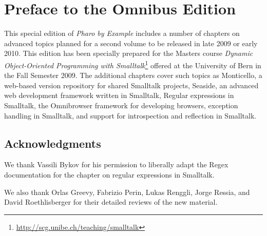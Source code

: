 \documentclass[a4paper,10pt,twoside]{book}
\begin{document}
	\sloppy
	\frontmatter
\fi
\chapter{Preface to the Omnibus Edition}\label{cha:omnibus}


This special edition of \emph{Pharo by Example} includes a number of chapters on advanced topics planned for a second volume to be released in late 2009 or early 2010.
This edition has been specially prepared for the Masters course \emph{Dynamic Object-Oriented Programming with Smalltalk}\footnote{\url{http://scg.unibe.ch/teaching/smalltalk}} offered at the University of Bern in the Fall Semester 2009.
The additional chapters cover such topics as
Monticello, a web-based version repository for shared Smalltalk projects,
Seaside, an advanced web development framework written in Smalltalk,
Regular expressions in Smalltalk,
the Omnibrowser framework for developing browsers,
exception handling in Smalltalk, and
support for introspection and reflection in Smalltalk.

\section*{Acknowledgments}

We thank Vassili Bykov for his permission to liberally adapt the Regex documentation for the chapter on regular expressions in Smalltalk.

We also thank
Orlas Greevy,
Fabrizio Perin,
Lukas Renggli,
Jorge Ressia,
and
David Roethlisberger
for their detailed reviews of the new material.




\ifx\wholebook\relax\else
   
   
\end{document}
